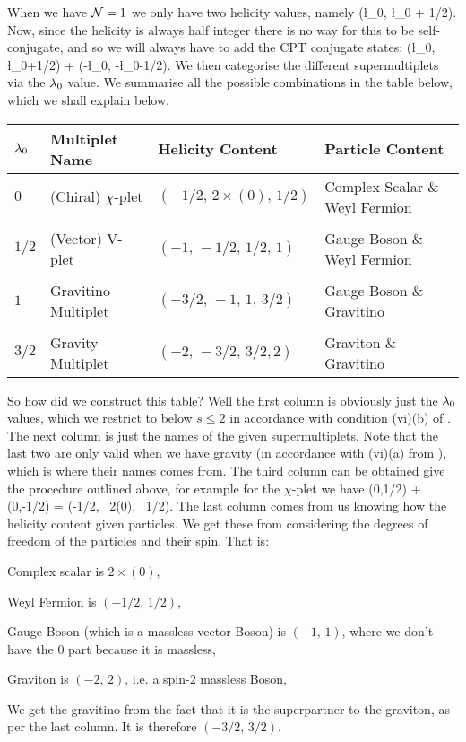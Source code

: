 When we have $\mathcal{N}=1$ we only have two helicity values, namely
\bse 
    (\l_0, \l_0 + 1/2).  
\ese 
Now, since the helicity is always half integer there is no way for this to be self-conjugate, and so we will always have to add the CPT conjugate states:
\bse 
    (\l_0, \l_0+1/2) + (-\l_0, -\l_0-1/2).
\ese 
We then categorise the different supermultiplets via the $\lambda_0$ value. We summarise all the possible combinations in the table below, which we shall explain below. 

\begin{center}
	\begin{tabular}{@{} C{1.5cm} C{4cm} C{4cm} C{5cm} @{}}
		\toprule
		$\lambda_0$ & Multiplet Name & Helicity Content & Particle Content \\
		\midrule 
		$0$ & (Chiral) $\chi$-plet & $(-1/2, \, 2\times (0), \,  1/2)$ & Complex Scalar \& Weyl Fermion \\ \\
		$1/2$ & (Vector) V-plet & $(-1, \, -1/2, \, 1/2, \, 1)$ & Gauge Boson \& Weyl Fermion \\ \\
		$1$ & Gravitino Multiplet & $(-3/2, \, -1, \, 1, \, 3/2)$ & Gauge Boson \& Gravitino \\ \\
		$3/2$ & Gravity Multiplet & $(-2,\, -3/2, \, 3/2, 2)$ & Graviton \& Gravitino \\ 
		\bottomrule
	\end{tabular}
\end{center}

So how did we construct this table? Well the first column is obviously just the $\lambda_0$ values, which we restrict to below $s\leq 2$ in accordance with condition (vi)(b) of . The next column is just the names of the given supermultiplets. Note that the last two are only valid when we have gravity (in accordance with (vi)(a) from ), which is where their names comes from. The third column can be obtained give the procedure outlined above, for example for the $\chi$-plet we have 
\bse 
    (0,1/2) + (0,-1/2) = (-1/2, \, 2\times (0), \, 1/2). 
\ese 
The last column comes from us knowing how the helicity content given particles. We get these from considering the degrees of freedom of the particles and their spin. That is:
\ben[label=(\roman*)]
    \item Complex scalar is $2\times (0)$, 
    \item Weyl Fermion is $(-1/2,\, 1/2)$,
    \item Gauge Boson (which is a massless vector Boson) is $(-1, \, 1)$, where we don't have the $0$ part because it is massless,
    \item Graviton is $(-2,\, 2)$, i.e. a spin-$2$ massless Boson,
    \item We get the gravitino from the fact that it is the superpartner to the graviton, as per the last column. It is therefore $(-3/2, \, 3/2)$. 
\een 

